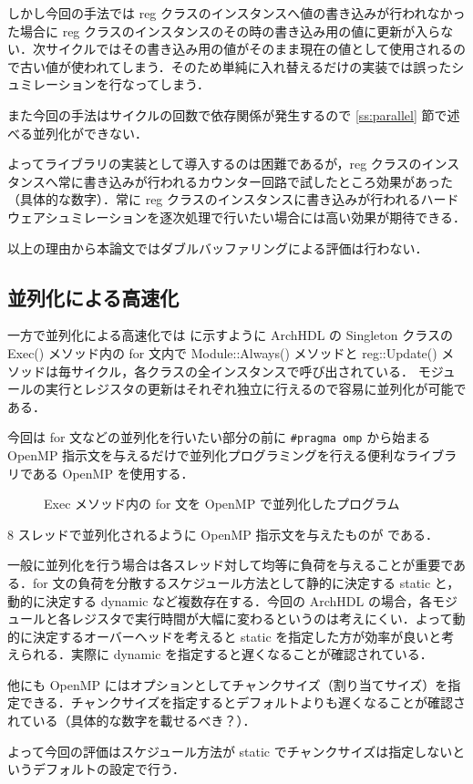 しかし今回の手法では reg
クラスのインスタンスへ値の書き込みが行われなかった場合に reg
クラスのインスタンスのその時の書き込み用の値に更新が入らない．次サイクルではその書き込み用の値がそのまま現在の値として使用されるので古い値が使われてしまう．そのため単純に入れ替えるだけの実装では誤ったシュミレーションを行なってしまう．

また今回の手法はサイクルの回数で依存関係が発生するので \ref{ss:parallel}
節で述べる並列化ができない．

よってライブラリの実装として導入するのは困難であるが，reg
クラスのインスタンスへ常に書き込みが行われるカウンター回路で試したところ効果があった（具体的な数字）．常に
reg
クラスのインスタンスに書き込みが行われるハードウェアシュミレーションを逐次処理で行いたい場合には高い効果が期待できる．

以上の理由から本論文ではダブルバッファリングによる評価は行わない．

\subsection{並列化による高速化 \label{ss:parallel}}

一方で並列化による高速化では  に示すように
ArchHDL の Singleton クラスの Exec() メソッド内の for 文内で
Module::Always() メソッドと reg::Update()
メソッドは毎サイクル，各クラスの全インスタンスで呼び出されている．
モジュールの実行とレジスタの更新はそれぞれ独立に行えるので容易に並列化が可能である．

今回は for 文などの並列化を行いたい部分の前に \verb/#pragma omp/
から始まる OpenMP
指示文を与えるだけで並列化プログラミングを行える便利なライブラリである
OpenMP \cite{openmp}を使用する．

\begin{figure}[t]
 
 \caption{Exec メソッド内の for 文を OpenMP で並列化したプログラム}
 \label{src:exec_openmp}
\end{figure}

8 スレッドで並列化されるように OpenMP 指示文を与えたものが
 である．

一般に並列化を行う場合は各スレッド対して均等に負荷を与えることが重要である．for
文の負荷を分散するスケジュール方法として静的に決定する static
と，動的に決定する dynamic など複数存在する．今回の ArchHDL
の場合，各モジュールと各レジスタで実行時間が大幅に変わるというのは考えにくい．よって動的に決定するオーバーヘッドを考えると
static を指定した方が効率が良いと考えられる．実際に dynamic
を指定すると遅くなることが確認されている．

他にも OpenMP
にはオプションとしてチャンクサイズ（割り当てサイズ）を指定できる．チャンクサイズを指定するとデフォルトよりも遅くなることが確認されている（具体的な数字を載せるべき？）．

よって今回の評価はスケジュール方法が static
でチャンクサイズは指定しないというデフォルトの設定で行う．

